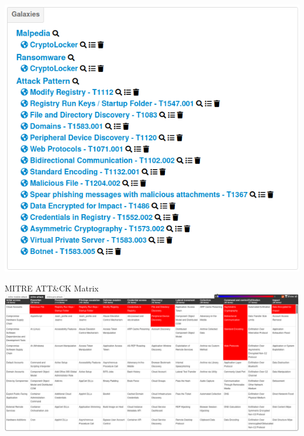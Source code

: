 \begin{frame}
    \vspace{-5pt}
    \begin{center}
        \includegraphics[width=0.73\linewidth]{pictures/case2/event-clusters.png}
    \end{center}
\end{frame}

\begin{frame}
    MITRE ATT\&CK Matrix\\

    \vspace{6pt}
    \includegraphics[width=1.0\linewidth]{pictures/case2/event-attack.png}
\end{frame}

